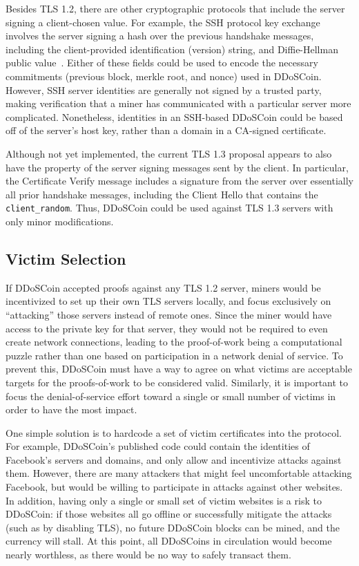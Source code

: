 Besides TLS 1.2, there are other cryptographic protocols that include the server
signing a client-chosen value. For example, the SSH protocol key exchange
involves the server signing a hash over the previous handshake messages,
including the client-provided identification (version) string, and
Diffie-Hellman public value~\cite{rfc4253}. Either of these fields could be used
to encode the necessary commitments (previous block, merkle root, and nonce)
used in DDoSCoin.  However, SSH server identities are generally not signed by a
trusted party, making verification that a miner has communicated with a
particular server more complicated.  Nonetheless, identities in an SSH-based
DDoSCoin could be based off of the server's host key, rather than a domain in a
CA-signed certificate.

Although not yet implemented, the current TLS 1.3 proposal appears to also have the
property of the server signing messages sent by the client. In particular, the
Certificate Verify message includes a signature from the server over essentially
all prior handshake messages, including the Client Hello that contains the
\texttt{client\_random}. Thus, DDoSCoin could be used against TLS 1.3
servers with only minor modifications.

\subsection{Victim Selection}
\label{sec:victim}

If DDoSCoin accepted proofs against any TLS 1.2 server, miners would be
incentivized to set up their own TLS servers locally, and focus exclusively on
``attacking'' those servers instead of remote ones. Since the miner would have
access to the private key for that server, they would not be required to even
create network connections, leading to the proof-of-work being a computational
puzzle rather than one based on participation in a network denial of service.
To prevent this, DDoSCoin must have a way to agree on what victims are
acceptable targets for the proofs-of-work to be considered valid. Similarly, it
is important to focus the denial-of-service effort toward a single or small
number of victims in order to have the most impact.

One simple solution is to hardcode a set of victim certificates into the
protocol.  For example, DDoSCoin's published code could contain the identities
of Facebook's servers and domains, and only allow and incentivize attacks
against them. However, there are many attackers that might feel uncomfortable
attacking Facebook, but would be willing to participate in attacks against other
websites. In addition, having only a single or small set of victim websites is a
risk to DDoSCoin: if those websites all go offline or successfully mitigate the
attacks (such as by disabling TLS), no future DDoSCoin blocks can be mined, and
the currency will stall. At this point, all DDoSCoins in circulation would
become nearly worthless, as there would be no way to safely transact them.

